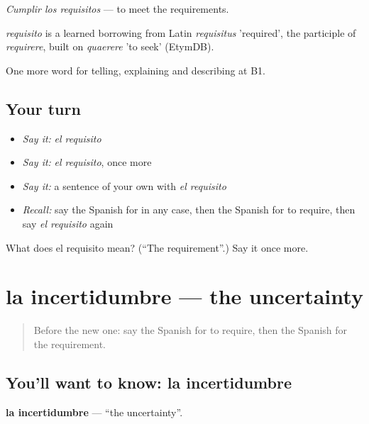 \emph{Cumplir los requisitos} — to meet the requirements.

\begin{cousinweb}
\emph{requisito} is a learned borrowing from Latin \emph{requisitus} 'required', the participle of \emph{requirere}, built on \emph{quaerere} 'to seek' (EtymDB).
\end{cousinweb}

\begin{grammarlens}[title={What you've built}]
One more word for telling, explaining and describing at B1.
\end{grammarlens}

\subsection*{Your turn}
\begin{itemize}
\raggedright
  \item \emph{Say it:} \emph{el requisito}
  \item \emph{Say it:} \emph{el requisito}, once more
  \item \emph{Say it:} a sentence of your own with \emph{el requisito}
  \item \emph{Recall:} say the Spanish for in any case, then the Spanish for to require, then say \emph{el requisito} again
\end{itemize}

\begin{tcolorbox}[breakable,colback=teal!4,colframe=teal!35!black,title={Before you move on}]
What does el requisito mean? (\textquotedblleft{}The requirement\textquotedblright{}.) Say it once more.
\end{tcolorbox}
\section[la incertidumbre]{la incertidumbre — the uncertainty}

\label{lesson:ES-C613-incertidumbre}



\begin{quote}
Before the new one: say the Spanish for to require, then the Spanish for the requirement.
\end{quote}

\subsection*{You'll want to know: la incertidumbre}
\textbf{la incertidumbre} — \textquotedblleft{}the uncertainty\textquotedblright{}.

